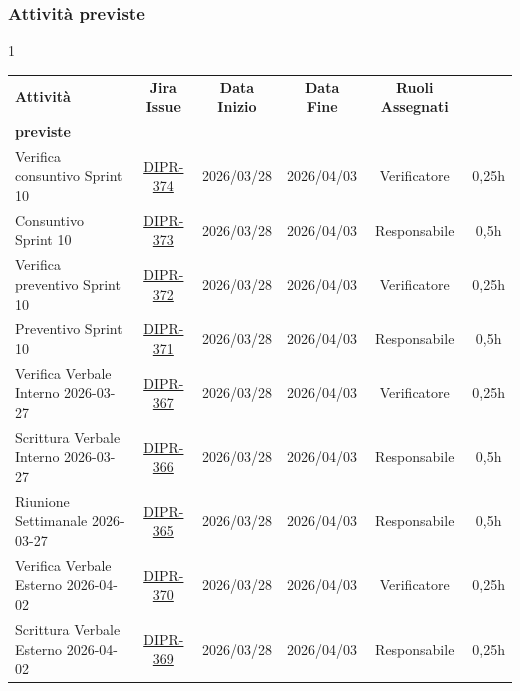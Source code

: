 \documentclass[a4paper,12pt]{article}
\begin{document}
\subsubsection{Attività previste}
\begin{spacing}{1}
    \small
\begin{longtable}{|p{4cm}|c|c|c|c|c|}
        \hline
        \rowcolor{zpusgreen!30}
        \textbf{Attività} & \textbf{Jira Issue} & \textbf{Data Inizio} & \textbf{Data Fine} & \textbf{Ruoli Assegnati} & \begin{tabular}[c]{@{}c@{}} \textbf{Ore} \\ \textbf{previste} \end{tabular} \\
        \hline
        Verifica consuntivo Sprint 10 & \href{https://7zpus.atlassian.net/browse/DIPR-374}{DIPR-374} & 2026/03/28 & 2026/04/03 & Verificatore & 0,25h \\
        \hline
        Consuntivo Sprint 10 & \href{https://7zpus.atlassian.net/browse/DIPR-373}{DIPR-373} & 2026/03/28 & 2026/04/03 & Responsabile & 0,5h \\
        \hline
        Verifica preventivo Sprint 10 & \href{https://7zpus.atlassian.net/browse/DIPR-372}{DIPR-372} & 2026/03/28 & 2026/04/03 & Verificatore & 0,25h \\
        \hline
        Preventivo Sprint 10 & \href{https://7zpus.atlassian.net/browse/DIPR-371}{DIPR-371} & 2026/03/28 & 2026/04/03 & Responsabile & 0,5h \\
        \hline
        Verifica Verbale Interno 2026-03-27 & \href{https://7zpus.atlassian.net/browse/DIPR-367}{DIPR-367} & 2026/03/28 & 2026/04/03 & Verificatore & 0,25h \\
        \hline
        Scrittura Verbale Interno 2026-03-27 & \href{https://7zpus.atlassian.net/browse/DIPR-366}{DIPR-366} & 2026/03/28 & 2026/04/03 & Responsabile & 0,5h \\
        \hline
        Riunione Settimanale 2026-03-27 & \href{https://7zpus.atlassian.net/browse/DIPR-365}{DIPR-365} & 2026/03/28 & 2026/04/03 & Responsabile & 0,5h \\
        \hline
        Verifica Verbale Esterno 2026-04-02 & \href{https://7zpus.atlassian.net/browse/DIPR-370}{DIPR-370} & 2026/03/28 & 2026/04/03 & Verificatore & 0,25h \\
        \hline
        Scrittura Verbale Esterno 2026-04-02 & \href{https://7zpus.atlassian.net/browse/DIPR-369}{DIPR-369} & 2026/03/28 & 2026/04/03 & Responsabile & 0,25h \\

\end{longtable}
\end{spacing}
\end{document}
